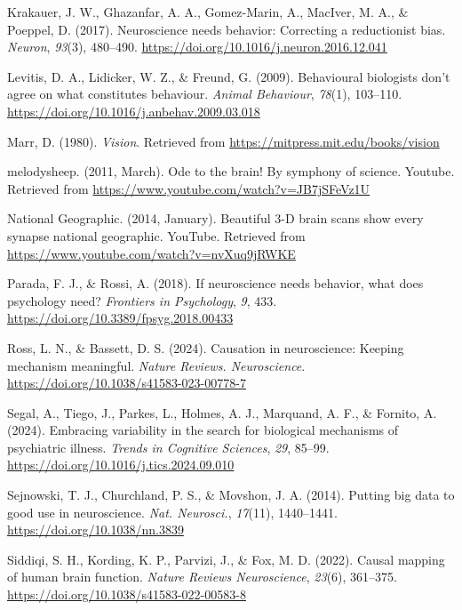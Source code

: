 \documentclass[
  letterpaper,
  DIV=11,
  numbers=noendperiod]{scrartcl}
\newlength{\cslhangindent}
\newenvironment{CSLReferences}[2] %
 {\begin{list}{}{%
  \setlength{\itemindent}{0pt}
  \setlength{\leftmargin}{0pt}
  \setlength{\parsep}{0pt}
  \ifodd #1
   \setlength{\leftmargin}{\cslhangindent}
   \setlength{\itemindent}{-1\cslhangindent}
  \fi
  \setlength{\itemsep}{#2\baselineskip}}}
 {\end{list}}
\begin{document}
\begin{CSLReferences}{1}{0}
Krakauer, J. W., Ghazanfar, A. A., Gomez-Marin, A., MacIver, M. A., \&
Poeppel, D. (2017). Neuroscience needs behavior: Correcting a
reductionist bias. \emph{Neuron}, \emph{93}(3), 480--490.
\url{https://doi.org/10.1016/j.neuron.2016.12.041}

Levitis, D. A., Lidicker, W. Z., \& Freund, G. (2009). Behavioural
biologists don't agree on what constitutes behaviour. \emph{Animal
Behaviour}, \emph{78}(1), 103--110.
\url{https://doi.org/10.1016/j.anbehav.2009.03.018}

Marr, D. (1980). \emph{Vision}. Retrieved from
\url{https://mitpress.mit.edu/books/vision}

melodysheep. (2011, March). Ode to the brain! By symphony of science.
Youtube. Retrieved from
\url{https://www.youtube.com/watch?v=JB7jSFeVz1U}

National Geographic. (2014, January). Beautiful {3-D} brain scans show
every synapse \textbar{} national geographic. You{T}ube. Retrieved from
\url{https://www.youtube.com/watch?v=nvXuq9jRWKE}

Parada, F. J., \& Rossi, A. (2018). If neuroscience needs behavior, what
does psychology need? \emph{Frontiers in Psychology}, \emph{9}, 433.
\url{https://doi.org/10.3389/fpsyg.2018.00433}

Ross, L. N., \& Bassett, D. S. (2024). Causation in neuroscience:
Keeping mechanism meaningful. \emph{Nature Reviews. Neuroscience}.
\url{https://doi.org/10.1038/s41583-023-00778-7}

Segal, A., Tiego, J., Parkes, L., Holmes, A. J., Marquand, A. F., \&
Fornito, A. (2024). Embracing variability in the search for biological
mechanisms of psychiatric illness. \emph{Trends in Cognitive Sciences},
\emph{29}, 85--99. \url{https://doi.org/10.1016/j.tics.2024.09.010}

Sejnowski, T. J., Churchland, P. S., \& Movshon, J. A. (2014). Putting
big data to good use in neuroscience. \emph{Nat. Neurosci.},
\emph{17}(11), 1440--1441. \url{https://doi.org/10.1038/nn.3839}

Siddiqi, S. H., Kording, K. P., Parvizi, J., \& Fox, M. D. (2022).
Causal mapping of human brain function. \emph{Nature {R}eviews
{N}euroscience}, \emph{23}(6), 361--375.
\url{https://doi.org/10.1038/s41583-022-00583-8}


\end{CSLReferences}
\end{document}
